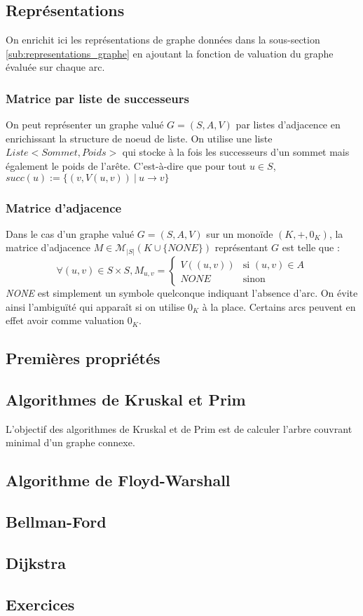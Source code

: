 \documentclass[../../../main.tex]{subfiles}
\begin{document}
\subsection{Représentations}
On enrichit ici les représentations de graphe données dans la sous-section \ref{sub:representations_graphe} en ajoutant la fonction de valuation du graphe évaluée sur chaque arc.
\subsubsection{Matrice par liste de successeurs}
On peut représenter un graphe valué $G = (S, A, V)$ par listes d'adjacence en enrichissant la structure de noeud de liste. On utilise une liste $Liste<Sommet, Poids>$ qui stocke à la fois les successeurs d'un sommet mais également le poids de l'arête. C'est-à-dire que pour tout $u\in S$, $succ(u) := \{(v, V(u, v))\ |\ u\rightarrow v\}$
\subsubsection{Matrice d'adjacence}
Dans le cas d'un graphe valué $G = (S, A, V)$ sur un monoïde $(K, +, 0_K)$, la matrice d'adjacence $M\in\mathcal{M}_{|S|}(K\cup\{\textit{NONE}\})$ représentant $G$ est telle que :
$$\forall (u, v)\in S\times S, M_{u, v} = \left\{\begin{array}{ll}
V((u, v)) & \text{si } (u, v)\in A \\
\textit{NONE} & \text{sinon}
\end{array}\right.$$
\textit{NONE} est simplement un symbole quelconque indiquant l'absence d'arc. On évite ainsi l'ambiguïté qui apparaît si on utilise $0_K$ à la place. Certains arcs peuvent en effet avoir comme valuation $0_K$.
\subsection{Premières propriétés}
\subsection{Algorithmes de Kruskal et Prim}
L'objectif des algorithmes de Kruskal et de Prim est de calculer l'arbre couvrant minimal d'un graphe connexe.
\subsection{Algorithme de Floyd-Warshall}
\subsection{Bellman-Ford}
\subsection{Dijkstra}
\subsection{Exercices}
\end{document}
